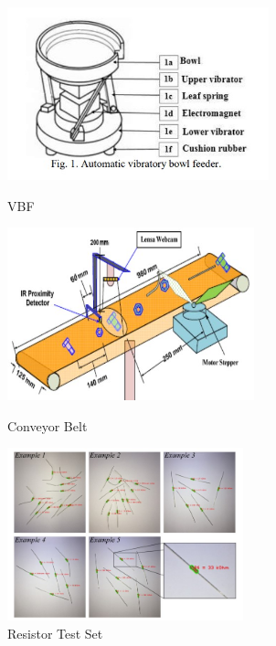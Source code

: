 \begin{figure}[t]
  \begin{minipage}[t]{0.33\textwidth}
    \centering
    \includegraphics[width=\textwidth,height=5cm, keepaspectratio]{imgs/articles/feeder.jpg}
    \caption{VBF\cite{nam2019design}}
    \label{fig:feeder}
  \end{minipage}
  \hfill
  \begin{minipage}[t]{0.33\textwidth}
      \centering
      \includegraphics[width=\textwidth,height=5cm, keepaspectratio]{imgs/articles/conveyor.jpg}
      \caption{Conveyor Belt\cite{Dhenge2013MechanicalNS}}
      \label{fig:conveyor}
      \end{minipage}
  \hfill
  \begin{minipage}[t]{0.33\textwidth}
    \centering
    \includegraphics[width=\textwidth,height=5cm, keepaspectratio]{imgs/articles/resistordata.jpg}
    \caption{Resistor Test Set\cite{8939034}}
    \label{fig:resistordata}
  \end{minipage}
\end{figure}

